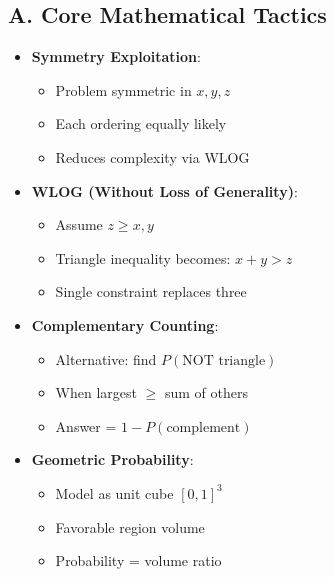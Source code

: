 \documentclass[11pt]{article}
\begin{document}
\begin{tacticalbox}
\subsection*{A. Core Mathematical Tactics}
\begin{itemize}[leftmargin=*]
    \item \textbf{Symmetry Exploitation}: 
    \begin{itemize}
        \item Problem symmetric in $x, y, z$
        \item Each ordering equally likely
        \item Reduces complexity via WLOG
    \end{itemize}
    \item \textbf{WLOG (Without Loss of Generality)}: 
    \begin{itemize}
        \item Assume $z \geq x, y$
        \item Triangle inequality becomes: $x+y>z$
        \item Single constraint replaces three
    \end{itemize}
    \item \textbf{Complementary Counting}: 
    \begin{itemize}
        \item Alternative: find $P(\text{NOT triangle})$
        \item When largest $\geq$ sum of others
        \item Answer = $1 - P(\text{complement})$
    \end{itemize}
    \item \textbf{Geometric Probability}: 
    \begin{itemize}
        \item Model as unit cube $[0,1]^3$
        \item Favorable region volume
        \item Probability = volume ratio
    \end{itemize}
\end{itemize}


\end{tacticalbox}
\end{document}

